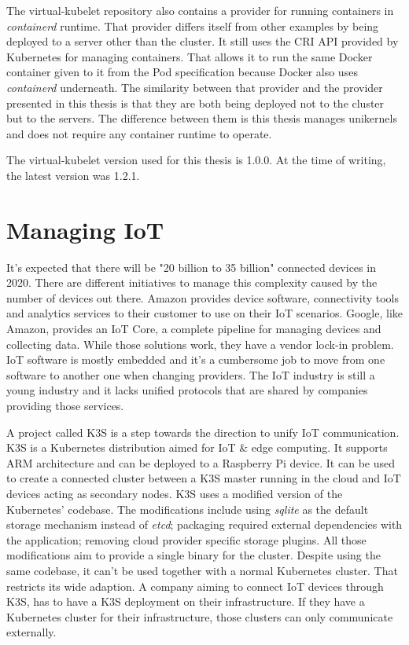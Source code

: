 The virtual-kubelet repository also contains a provider for running containers in \textit{containerd} runtime. That provider differs itself from other examples by being deployed to a server other than the cluster. It still uses the CRI API provided by Kubernetes for managing containers. That allows it to run the same Docker container given to it from the Pod specification because Docker also uses \textit{containerd} underneath. The similarity between that provider and the provider presented in this thesis is that they are both being deployed not to the cluster but to the servers. The difference between them is this thesis manages unikernels and does not require any container runtime to operate.

The virtual-kubelet version used for this thesis is 1.0.0. At the time of writing, the latest version was 1.2.1.
\section{Managing IoT}
It's expected that there will be "20 billion to 35 billion" \cite{unikernels-improve} connected devices in 2020. There are different initiatives to manage this complexity caused by the number of devices out there. Amazon provides device software, connectivity tools and analytics services to their customer to use on their IoT scenarios. Google, like Amazon, provides an IoT Core, a complete pipeline for managing devices and collecting data. While those solutions work, they have a vendor lock-in problem. IoT software is mostly embedded and it's a cumbersome job to move from one software to another one when changing providers. The IoT industry is still a young industry and it lacks unified protocols that are shared by companies providing those services.

A project called K3S \cite{k3s} is a step towards the direction to unify IoT communication. K3S is a Kubernetes distribution aimed for IoT \& edge computing. It supports ARM architecture and can be deployed to a Raspberry Pi device. It can be used to create a connected cluster between a K3S master running in the cloud and IoT devices acting as secondary nodes. K3S uses a modified version of the Kubernetes' codebase. The modifications include using \textit{sqlite} as the default storage mechanism instead of \textit{etcd}; packaging required external dependencies with the application; removing cloud provider specific storage plugins. All those modifications aim to provide a single binary for the cluster. Despite using the same codebase, it can't be used together with a normal Kubernetes cluster. That restricts its wide adaption. A company aiming to connect IoT devices through K3S, has to have a K3S deployment on their infrastructure. If they have a Kubernetes cluster for their infrastructure, those clusters can only communicate externally.

